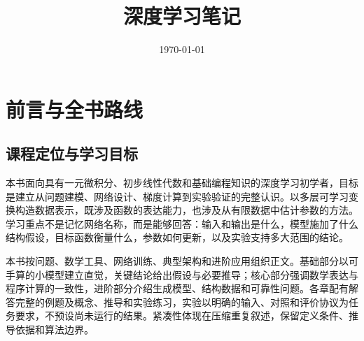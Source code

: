 \documentclass[UTF8,12pt,a4paper,fontset=fandol]{ctexbook}
\title{深度学习笔记}
\author{}
\date{\today}
\begin{document}
\maketitle
\tableofcontents
\clearpage


\chapter*{前言与全书路线}

\section*{课程定位与学习目标}
本书面向具有一元微积分、初步线性代数和基础编程知识的深度学习初学者，目标是建立从问题建模、网络设计、梯度计算到实验验证的完整认识。以多层可学习变换构造数据表示，既涉及函数的表达能力，也涉及从有限数据中估计参数的方法。学习重点不是记忆网络名称，而是能够回答：输入和输出是什么，模型施加了什么结构假设，目标函数衡量什么，参数如何更新，以及实验支持多大范围的结论。

本书按问题、数学工具、网络训练、典型架构和进阶应用组织正文。基础部分以可手算的小模型建立直觉，关键结论给出假设与必要推导；核心部分强调数学表达与程序计算的一致性，进阶部分介绍生成模型、结构数据和可靠性问题。各章配有解答完整的例题及概念、推导和实验练习，实验以明确的输入、对照和评价协议为任务要求，不预设尚未运行的结果。紧凑性体现在压缩重复叙述，保留定义条件、推导依据和算法边界。
\end{document}
